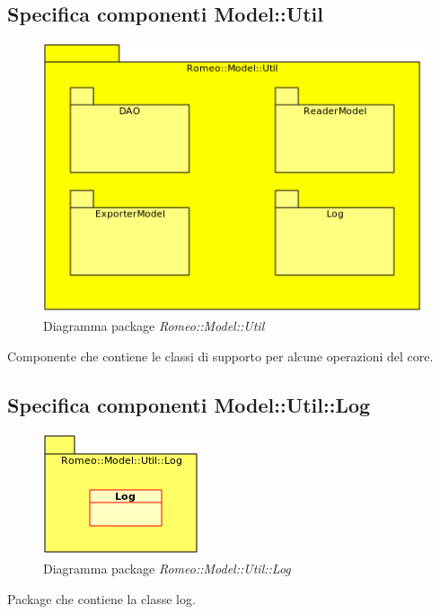 \pagebreak
\subsection{Specifica componenti Model::Util}
\label{specificaUtil}
\begin{figure}[!h]
\centering
\includegraphics[scale=1]{../Specifica_Tecnica/Content/Immagini/Romeo__Model__Util.png}
			\caption{Diagramma package \textsl{Romeo::Model::Util}}
			\label{comp_romeo::model::util}
\end{figure}
Componente che contiene le classi di supporto per alcune operazioni del core.
\subsection{Specifica componenti Model::Util::Log}
\label{specificaLog}
\begin{figure}[!h]
\centering
\includegraphics[scale=1]{../Specifica_Tecnica/Content/Immagini/Romeo__Model__Util__Log.png}
			\caption{Diagramma package \textsl{Romeo::Model::Util::Log}}
			\label{comp_romeo::model::util::log}
\end{figure}
Package\g{} che contiene la classe log.
